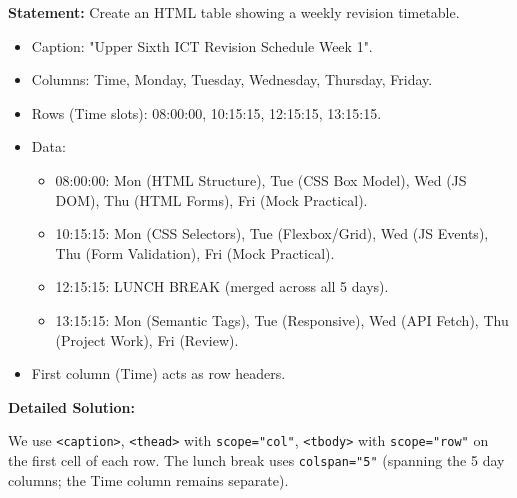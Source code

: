 \documentclass[11pt]{article}
\begin{document}
\begin{exoresolu}
\textbf{Statement:} Create an HTML table showing a weekly revision timetable.
\begin{itemize}
    \item Caption: "Upper Sixth ICT Revision Schedule \textemdash Week 1".
    \item Columns: Time, Monday, Tuesday, Wednesday, Thursday, Friday.
    \item Rows (Time slots): 08:00:00, 10:15:15, 12:15:15, 13:15:15.
    \item Data:
        \begin{itemize}
            \item 08:00:00: Mon (HTML Structure), Tue (CSS Box Model), Wed (JS DOM), Thu (HTML Forms), Fri (Mock Practical).
            \item 10:15:15: Mon (CSS Selectors), Tue (Flexbox/Grid), Wed (JS Events), Thu (Form Validation), Fri (Mock Practical).
            \item 12:15:15: LUNCH BREAK (merged across all 5 days).
            \item 13:15:15: Mon (Semantic Tags), Tue (Responsive), Wed (API Fetch), Thu (Project Work), Fri (Review).
        \end{itemize}
    \item First column (Time) acts as row headers.
\end{itemize}
\tcblower
\textbf{Detailed Solution:}

We use \texttt{<caption>}, \texttt{<thead>} with \texttt{scope="col"}, \texttt{<tbody>} with \texttt{scope="row"} on the first cell of each row. The lunch break uses \texttt{colspan="5"} (spanning the 5 day columns; the Time column remains separate).


\end{exoresolu}
\end{document}
